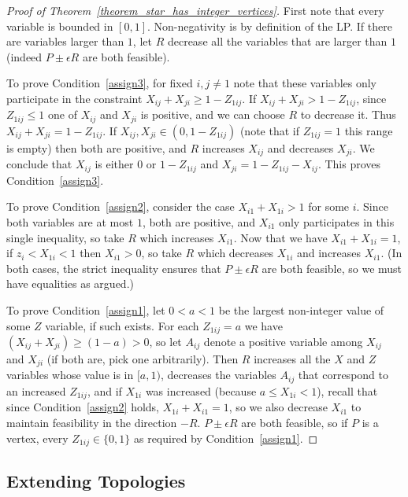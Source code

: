 \begin{proof}[Proof of Theorem~\ref{theorem_star_has_integer_vertices}]
First note that every variable is bounded in $[0,1]$. Non-negativity is by definition of the LP. If there are variables larger than $1$, let $R$ decrease all the variables that are larger than $1$ (indeed $P \pm \epsilon R$ are both feasible).

To prove Condition~\ref{assign3}, for fixed $i,j \ne 1$ note that these variables only participate in the constraint $X_{ij}+X_{ji} \ge 1 - Z_{1ij}$. If $X_{ij}+X_{ji} > 1 - Z_{1ij}$, since $Z_{1ij} \le 1$ one of $X_{ij}$ and $X_{ji}$ is positive, and we can choose $R$ to decrease it. Thus $X_{ij} + X_{ji} = 1 - Z_{1ij}$. If $X_{ij},X_{ji} \in (0,1-Z_{1ij})$ (note that if $Z_{1ij}=1$ this range is empty) then both are positive, and $R$ increases $X_{ij}$ and decreases $X_{ji}$. We conclude that $X_{ij}$ is either $0$ or $1-Z_{1ij}$ and $X_{ji} = 1-Z_{1ij}-X_{ij}$. This proves Condition~\ref{assign3}.

To prove Condition~\ref{assign2}, consider the case $X_{i1} + X_{1i} > 1$ for some $i$. Since both variables are at most $1$, both are positive, and $X_{i1}$ only participates in this single inequality, so take $R$ which increases $X_{i1}$. Now that we have $X_{i1} + X_{1i} = 1$, if $z_i < X_{1i} < 1$ then $X_{i1} > 0$, so take $R$ which decreases $X_{1i}$ and increases $X_{i1}$. (In both cases, the strict inequality ensures that $P \pm \epsilon R$ are both feasible, so we must have equalities as argued.)

To prove Condition~\ref{assign1}, let $0<a<1$ be the largest non-integer value of some $Z$ variable, if such exists. For each $Z_{1ij}=a$ we have $(X_{ij}+X_{ji}) \ge (1-a) > 0$, so let $A_{ij}$ denote a positive variable among $X_{ij}$ and $X_{ji}$ (if both are, pick one arbitrarily). Then $R$ increases all the $X$ and $Z$ variables whose value is in $[a,1)$, decreases the variables $A_{ij}$ that correspond to an increased $Z_{1ij}$, and if $X_{1i}$ was increased (because $a \le X_{1i} < 1$), recall that since Condition~\ref{assign2} holds, $X_{1i} + X_{i1} = 1$, so we also decrease $X_{i1}$ to maintain feasibility in the direction $-R$. $P \pm \epsilon R$ are both feasible, so if $P$ is a vertex, every $Z_{1ij} \in \{0,1\}$ as required by Condition~\ref{assign1}.
\end{proof}



\subsection{Extending Topologies}
\label{subsection_graph_extensions}

